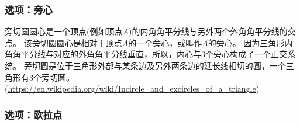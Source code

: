 \documentclass[../main.tex]{subfiles}
\begin{document}
\newpage

\subsubsection{选项：旁心}

旁切圆圆心是一个顶点(例如顶点$A$)的内角角平分线与另外两个外角角平分线的交点。
该旁切圆圆心是相对于顶点$A$的一个旁心，或叫作$A$的旁心。
因为三角形内角角平分线与对应的外角角平分线垂直，所以，内心与3个旁心构成了一个正交系统。
旁切圆是位于三角形外部与某条边及另外两条边的延长线相切的圆，一个三角形有3个旁切圆。
(\url{https://en.wikipedia.org/wiki/Incircle_and_excircles_of_a_triangle})


\begin{tkzexample}[latex=7.5cm,small]
\end{tkzexample}

\vspace*{-10pt}

\subsubsection{选项：欧拉点}
\end{document}
